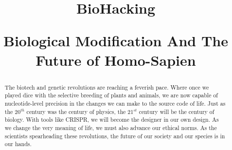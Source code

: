 \documentclass{article}
\title{BioHacking \\
\begin{large} 
    Biological Modification And The Future of Homo-Sapien
\end{large} }	%
\begin{document}
\maketitlepage
\newpage


\begin{abstract}
    The biotech and genetic revolutions are reaching a feverish pace.
    Where once we played dice with the selective breeding of plants and animals, we are now capable of nucleotide-level precision in the changes we can make to the source code of life.
    Just as the 20$^{th}$ century was the century of physics, the 21$^{st}$ century will be the century of biology.
    With tools like CRISPR, we will become the designer in our own design.
    As we change the very meaning of life, we must also advance our ethical norms.
    As the scientists spearheading these revolutions, the future of our society and our species is in our hands.
\end{abstract}
\newpage

\makeheader	%
\maketitle	%






\newpage
\makeworkscited
\end{document}
